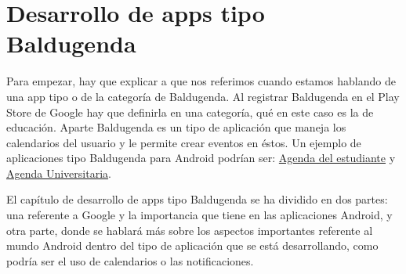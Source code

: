\chapter{Desarrollo de apps tipo Baldugenda}
\label{ch:desarrollo}
Para empezar, hay que explicar a que nos referimos cuando estamos hablando de una app tipo o de la categoría de Baldugenda. Al registrar Baldugenda en el Play Store de Google hay que definirla en una categoría, qué en este caso es la de educación. Aparte Baldugenda es un tipo de aplicación que maneja los calendarios del usuario y le permite crear eventos en éstos. Un ejemplo de aplicaciones tipo Baldugenda para Android podrían ser:  \href{https://play.google.com/store/apps/details?id=com.clawdyvan.agendadigitalaluno&hl=es}{Agenda del estudiante} y \href{https://play.google.com/store/apps/details?id=ugr.cursoandroid.agendauniversitaria&hl=es}{Agenda Universitaria}.

El capítulo de desarrollo de apps tipo Baldugenda se ha dividido en dos partes: una referente a Google y la importancia que tiene en las aplicaciones Android, y otra parte, donde se hablará más sobre los aspectos importantes referente al mundo Android dentro del tipo de aplicación que se está desarrollando, como podría ser el uso de calendarios o las notificaciones.




\newpage























